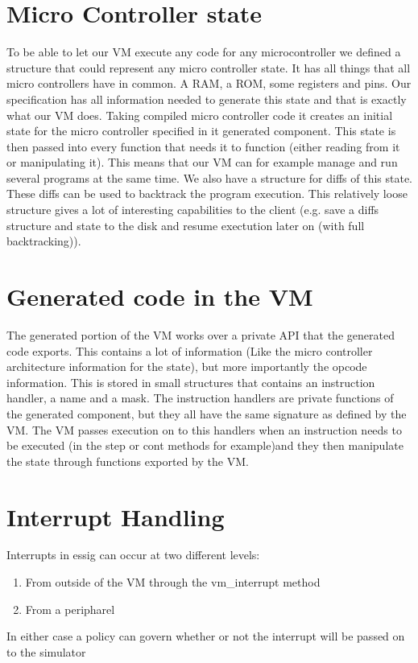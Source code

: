 \documentclass[a4paper]{report}
\begin{document}
\section{Micro Controller state}
To be able to let our VM execute any code for any microcontroller we
defined a structure that could represent any micro controller state. It
has all things that all micro controllers have in common. A RAM, a ROM,
some registers and pins. Our specification has all information needed
to generate this state and that is exactly what our VM does. Taking
compiled micro controller code it creates an initial state for the
micro controller specified in it generated component. This state is
then passed into every function that needs it to function (either
reading from it or manipulating it). This means that our VM can for
example manage and run several programs at the same time. We also have
a structure for diffs of this state. These diffs can be used to
backtrack the program execution. This relatively loose structure gives
a lot of interesting capabilities to the client (e.g. save a diffs
structure and state to the disk and resume exectution later on (with
full backtracking)).

\section{Generated code in the VM}
The generated portion of the VM works over a private API that the
generated code exports. This contains a lot of information (Like the
micro controller architecture information for the state), but more
importantly the opcode information. This is stored in small structures
that contains an instruction handler, a name and a mask. The
instruction handlers are private functions of the generated component,
but they all have the same signature as defined by the VM. The VM
passes execution on to this handlers when an instruction needs to be
executed (in the step or cont methods for example)and they then
manipulate the state through functions exported by the VM.

\section[Interrupt Handling]{Interrupt Handling}
Interrupts in essig can occur at two different levels:

\begin{enumerate}
\item {
From outside of the VM through the vm\_interrupt method }
\item {
From a peripharel }
\end{enumerate}
In either case a policy can govern whether or not the interrupt will be
passed on to the simulator
\end{document}

